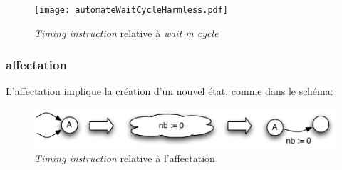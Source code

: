 \documentclass[11pt,a4paper]{article}
\begin{document}
\begin{figure}[htbp] %
   \centering
   \texttt{[image: automateWaitCycleHarmless.pdf]} 
   \caption{\emph{Timing instruction} relative à \emph{wait m cycle}}
   \label{fig:automateWaitCycle}
\end{figure}

%
%

\subsubsection{affectation}
L'affectation implique la création d'un nouvel état, comme dans le schéma:

\begin{figure}[htbp] %
   \centering
   \includegraphics[width=\linewidth]{automateAffectation.pdf} 
   \caption{\emph{Timing instruction} relative à l'affectation}
   \label{fig:automateAffectation}
\end{figure}
\end{document}

